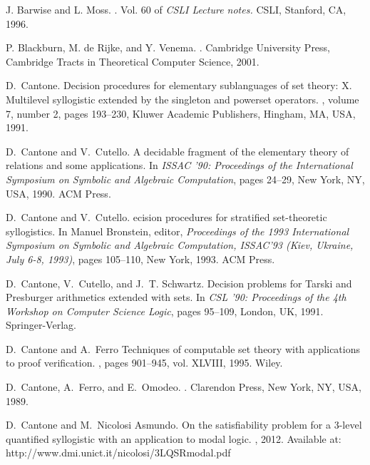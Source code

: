 \documentclass{fundam}
\begin{document}

\begin{thebibliography}{10}

 J. Barwise and L. Moss.
.
\newblock Vol. 60 of {\em CSLI Lecture notes.} CSLI, Stanford, CA, 1996.

P. Blackburn, M. de Rijke, and Y. Venema.
.
\newblock Cambridge University Press, Cambridge Tracts in Theoretical Computer Science, 2001.


D.~Cantone.
\newblock Decision procedures for elementary sublanguages of set theory: X. Multilevel syllogistic extended by the singleton and powerset operators.
, volume 7, number 2, pages 193--230, Kluwer Academic Publishers,
Hingham, MA, USA, 1991.


D.~Cantone and V.~Cutello.
\newblock A decidable fragment of the elementary theory of relations and some
  applications.
\newblock In {\em ISSAC '90: Proceedings of the International Symposium on
  Symbolic and Algebraic Computation}, pages 24--29, New York, NY, USA, 1990.
  ACM Press.

D.~Cantone and V.~Cutello.
ecision procedures for stratified set-theoretic syllogistics.
\newblock In Manuel Bronstein, editor, {\em Proceedings of the 1993
  International Symposium on Symbolic and Algebraic Computation, ISSAC'93
  (Kiev, Ukraine, July 6-8, 1993)}, pages 105--110, New York, 1993. ACM Press.

D.~Cantone, V.~Cutello, and J.~T. Schwartz.  \newblock Decision
problems for Tarski and Presburger arithmetics extended with sets.
\newblock In {\em CSL '90: Proceedings of the 4th Workshop on Computer
Science Logic}, pages 95--109, London, UK, 1991.  Springer-Verlag.

D.~Cantone and A.~Ferro
\newblock Techniques of computable set theory with applications to proof verification.
, pages 901--945, vol. XLVIII, 1995. Wiley.


D.~Cantone, A.~Ferro, and E.~Omodeo.
.
\newblock Clarendon Press, New York, NY, USA, 1989.



D.~Cantone and M.~Nicolosi Asmundo.
\newblock On the satisfiability problem for a 3-level
quantified syllogistic with an application to modal logic.
, 2012.
Available at: http://www.dmi.unict.it/nicolosi/3LQSRmodal.pdf


\end{thebibliography}
\end{document}
